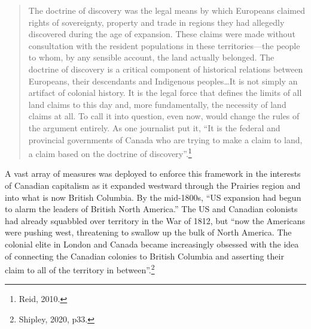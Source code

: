 \blockquote{The doctrine of discovery was the legal means by which Europeans claimed rights of sovereignty, property and trade in regions they had allegedly discovered during the age of expansion. These claims were made without consultation with the resident populations in these territories---the people to whom, by any sensible account, the land actually belonged. The doctrine of discovery is a critical component of historical relations between Europeans, their descendants and Indigenous peoples\ldots It is not simply an artifact of colonial history. It is the legal force that defines the limits of all land claims to this day and, more fundamentally, the necessity of land claims at all. To call it into question, even now, would change the rules of the argument entirely. As one journalist put it, ``It is the federal and provincial governments of Canada who are trying to make a claim to land, a claim based on the doctrine of discovery''.\footnote{Reid, 2010.}}

A vast array of measures was deployed to enforce this framework in the interests of Canadian capitalism as it expanded westward through the Prairies region and into what is now British Columbia. By the mid-1800s, ``US expansion had begun to alarm the leaders of British North America.'' The US and Canadian colonists had already squabbled over territory in the War of 1812, but ``now the Americans were pushing west, threatening to swallow up the bulk of North America. The colonial elite in London and Canada became increasingly obsessed with the idea of connecting the Canadian colonies to British Columbia and asserting their claim to all of the territory in between''.\footnote{Shipley, 2020, p33.}

